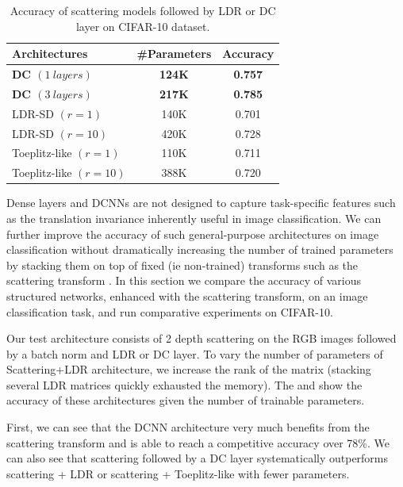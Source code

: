 \begin{table}[htb]
  \centering
  \begin{tabular}{lcc}
    \toprule
    \textbf{Architectures} & \textbf{\#Parameters} & \textbf{Accuracy}  \\
    \midrule
    \textbf{DC $(1\ layers)$} & \textbf{124K} & \textbf{0.757} \\
    \textbf{DC $(3\ layers)$} & \textbf{217K} & \textbf{0.785} \\
    LDR-SD $(r=1)$ & 140K & 0.701 \\
    LDR-SD $(r=10)$ & 420K & 0.728 \\
    Toeplitz-like $(r=1)$ & 110K & 0.711 \\
    Toeplitz-like $(r=10)$ & 388K & 0.720 \\
    \bottomrule
    \end{tabular}
    \caption{Accuracy of scattering models followed by LDR or DC layer on CIFAR-10 dataset.}
    \label{table:ch4-xp_ldr_scattering}
\end{table}




Dense layers and DCNNs are not designed to capture task-specific features such as the translation invariance inherently useful in image classification.
We can further improve the accuracy of such general-purpose architectures on image classification without dramatically increasing the number of trained parameters by stacking them on top of fixed (ie non-trained) transforms such as the scattering transform \cite{mallat2010recursive}.
In this section we compare the accuracy of various structured networks, enhanced with the scattering transform, on an image classification task, and run comparative experiments on CIFAR-10. 

Our test architecture consists of 2 depth scattering on the RGB images followed by a batch norm and LDR or DC layer.
To vary the number of parameters of Scattering+LDR architecture, we increase the rank of the matrix (stacking several LDR matrices quickly exhausted the memory).
The  and  show the accuracy of these architectures given the number of trainable parameters.

First, we can see that the DCNN architecture very much benefits from the scattering transform and is able to reach a competitive accuracy over 78\%.
We can also see that scattering followed by a DC layer systematically outperforms scattering + LDR or scattering + Toeplitz-like with fewer parameters. 





